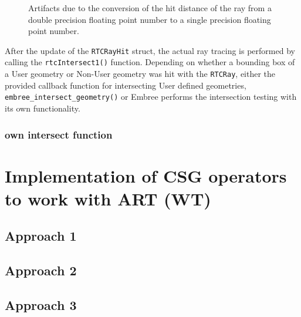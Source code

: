 \begin{figure}[!tbp]
	\centering
	\hfill
	\caption{Artifacts due to the conversion of the hit distance of the ray from a double precision floating point number to a single precision floating point number.}
	\label{fig:offset}
\end{figure}

After the update of the \texttt{RTCRayHit} struct, the actual ray tracing is performed by calling the \texttt{rtcIntersect1()} function. Depending on whether a bounding box of a User geometry or Non-User geometry was hit with the \texttt{RTCRay}, either the provided callback function for intersecting User defined geometries, \texttt{embree\_intersect\_geometry()} or Embree performs the intersection testing with its own functionality. 


\subsubsection{own intersect function}



\section{Implementation of CSG operators to work with ART (WT)}
\subsection{Approach 1}
\subsection{Approach 2}
\subsection{Approach 3}
